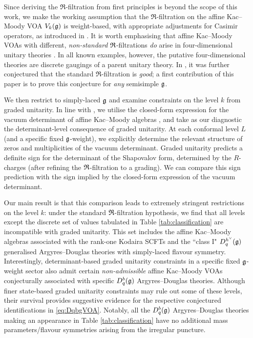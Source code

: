 Since deriving the $\mathfrak{R}$-filtration from first principles is beyond the scope of this work, we make the working assumption that the $\mathfrak{R}$-filtration on the affine Kac--Moody VOA $V_k(\mathfrak{g})$ is weight-based, with appropriate adjustments for Casimir operators, as introduced in \cite{ArabiArdehali:2025fad}. It is worth emphasising that affine Kac--Moody VOAs with different, \emph{non-standard} $\mathfrak{R}$-filtrations \emph{do} arise in four-dimensional unitary theories \cite{Beem:2026peg}. In all known examples, however, the putative four-dimensional theories are discrete gaugings of a parent unitary theory. In \cite{ArabiArdehali:2025fad}, it was further conjectured that the standard $\mathfrak{R}$-filtration is \emph{good}; a first contribution of this paper is to prove this conjecture for \emph{any} semisimple $\mathfrak{g}$. 

We then restrict to simply-laced $\mathfrak{g}$ and examine constraints on the level $k$ from graded unitarity. In line with \cite{ArabiArdehali:2025fad}, we utilise the closed-form expression for the vacuum determinant of affine Kac--Moody algebras \cite{gorelik2007simplicity}, and take as our diagnostic the determinant-level consequence of graded unitarity. At each conformal level $L$ (and a specific fixed $\mathfrak{g}$-weight), we explicitly determine the relevant structure of zeros and multiplicities of the vacuum determinant. Graded unitarity predicts a definite sign for the determinant of the Shapovalov form, determined by the $R$-charges (after refining the $\mathfrak{R}$-filtration to a grading). We can compare this sign prediction with the sign implied by the closed-form expression of the vacuum determinant. 



Our main result is that this comparison leads to extremely stringent restrictions on the level $k$: under the standard $\mathfrak{R}$-filtration hypothesis, we find that all levels except the discrete set of values tabulated in Table \ref{tab:classification} are incompatible with graded unitarity. This set includes the affine Kac--Moody algebras associated with the rank-one Kodaira SCFTs and the ``class I" $D_q^{h^\vee}(\mathfrak{g})$ generalised Argyres--Douglas theories with simply-laced flavour symmetry. Interestingly, determinant-based graded unitarity constraints in a specific fixed $\mathfrak{g}$-weight sector also admit certain \emph{non-admissible} affine Kac--Moody VOAs conjecturally associated with specific $D_q^b(\mathfrak{g})$ Argyres--Douglas theories. Although finer state-based graded unitarity constraints may rule out some of these levels, their survival provides suggestive evidence for the respective conjectured identifications in \eqref{eq:DqbgVOA}. Notably, all the $D_q^b(\mathfrak{g})$ Argyres--Douglas theories making an appearance in Table \ref{tab:classification} have no additional mass parameters/flavour symmetries arising from the irregular puncture.

